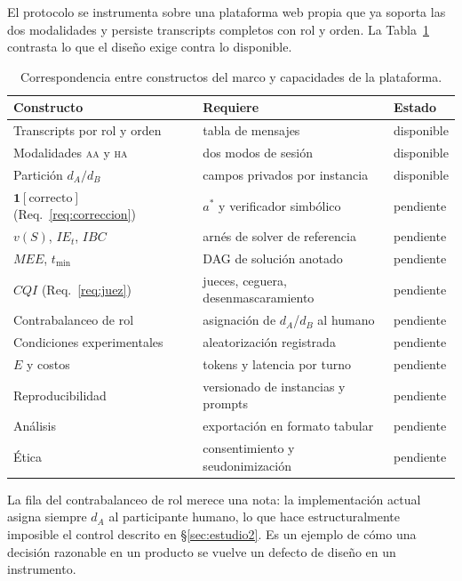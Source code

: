 \documentclass[11pt,a4paper]{article}
\theoremstyle{definition}
\theoremstyle{plain}
\theoremstyle{remark}
\newcommand{\ind}[1]{\mathbf{1}\!\left[#1\right]}
\newcommand{\modAA}{\textsc{aa}}
\newcommand{\modHA}{\textsc{ha}}
\begin{document}
El protocolo se instrumenta sobre una plataforma web propia que ya soporta las dos
modalidades y persiste transcripts completos con rol y orden. La
Tabla~\ref{tab:brecha} contrasta lo que el diseño exige contra lo disponible.

\begin{table}[t]
\centering
\small
\begin{tabular}{@{}lll@{}}
\toprule
\textbf{Constructo} & \textbf{Requiere} & \textbf{Estado} \\
\midrule
Transcripts por rol y orden          & tabla de mensajes                     & disponible \\
Modalidades \modAA{} y \modHA{}      & dos modos de sesión                   & disponible \\
Partición $d_A/d_B$                  & campos privados por instancia         & disponible \\
$\ind{\text{correcto}}$ (Req.~\ref{req:correccion}) & $a^\ast$ y verificador simbólico & pendiente \\
$v(S)$, $IE_t$, $IBC$                & arnés de solver de referencia         & pendiente \\
$MEE$, $t_{\min}$                    & DAG de solución anotado               & pendiente \\
$CQI$ (Req.~\ref{req:juez})          & jueces, ceguera, desenmascaramiento   & pendiente \\
Contrabalanceo de rol                & asignación de $d_A$/$d_B$ al humano   & pendiente \\
Condiciones experimentales           & aleatorización registrada             & pendiente \\
$E$ y costos                         & tokens y latencia por turno           & pendiente \\
Reproducibilidad                     & versionado de instancias y prompts    & pendiente \\
Análisis                             & exportación en formato tabular        & pendiente \\
Ética                                & consentimiento y seudonimización      & pendiente \\
\bottomrule
\end{tabular}
\caption{Correspondencia entre constructos del marco y capacidades de la
plataforma.}
\label{tab:brecha}
\end{table}

La fila del contrabalanceo de rol merece una nota: la implementación actual asigna
siempre $d_A$ al participante humano, lo que hace estructuralmente imposible el
control descrito en §\ref{sec:estudio2}. Es un ejemplo de cómo una decisión
razonable en un producto se vuelve un defecto de diseño en un instrumento.
\end{document}
